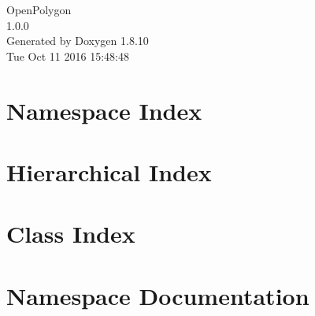 \documentclass[twoside]{book}
\newcommand{\+}{\discretionary{\mbox{\scriptsize$\hookleftarrow$}}{}{}}
\newcommand{\clearemptydoublepage}{%
  \newpage{\pagestyle{empty}\cleardoublepage}%
}
\begin{document}
\hypersetup{pageanchor=false,
             bookmarks=true,
             bookmarksnumbered=true,
             pdfencoding=unicode
            }
\begin{titlepage}
\vspace*{7cm}
\begin{center}%
{\Large Open\+Polygon \\[1ex]\large 1.\+0.\+0 }\\
\vspace*{1cm}
{\large Generated by Doxygen 1.8.10}\\
\vspace*{0.5cm}
{\small Tue Oct 11 2016 15:48:48}\\
\end{center}
\end{titlepage}
\clearemptydoublepage
\tableofcontents
\clearemptydoublepage
{}
\hypersetup{pageanchor=true}

\chapter{Namespace Index}

\chapter{Hierarchical Index}

\chapter{Class Index}

\chapter{Namespace Documentation}

\end{document}
